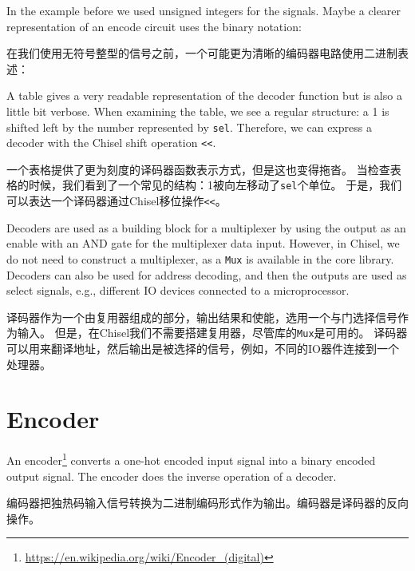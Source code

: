 \documentclass[%
    10pt,
    headinclude, footexclude,
    openright, %
    notitlepage,
    cleardoubleempty,
    headsepline,
    pointlessnumbers,
    bibtotoc, idxtotoc,
    ]{scrbook}
\newcommand{\code}[1]{{\small{\texttt{#1}}}}
\newcommand{\todo}[1]{{\emph{TODO: #1}}}
\newcommand{\myref}[2]{\href{#1}{#2}}
\renewcommand{\myref}[2]{{#2}{\footnote{\url{#1}}}}
\renewcommand{\todo}[1]{}
\begin{document}
In the example before we used unsigned integers for the signals. Maybe a clearer representation
of an encode circuit uses the binary notation:

在我们使用无符号整型的信号之前，一个可能更为清晰的编码器电路使用二进制表述：


\todo{from Luca: for very small examples. What if the one-hot input is 256 wires? Can Chisel capture that? Or I need 256 lines? I would suggest to put an additional example. Maybe there is something like the for loop in VHDL.}

A table gives a very readable representation of the decoder function but is also
a little bit verbose.
When examining the table, we see a regular structure: a 1 is shifted left by the number
represented by \code{sel}. Therefore, we can express a decoder with the Chisel shift
operation \code{<<}.

一个表格提供了更为刻度的译码器函数表示方式，但是这也变得拖沓。
当检查表格的时候，我们看到了一个常见的结构：1被向左移动了\code{sel}个单位。
于是，我们可以表达一个译码器通过Chisel移位操作\code{<<}。


Decoders are used as a building block for a multiplexer by using the output as an enable
with an AND gate for the multiplexer data input. However, in Chisel, we do not need to construct
a multiplexer, as a \code{Mux} is available in the core library.
Decoders can also be used for address decoding, and then the outputs are used as
select signals, e.g., different IO devices connected to a microprocessor. 

译码器作为一个由复用器组成的部分，输出结果和使能，选用一个与门选择信号作为输入。
但是，在Chisel我们不需要搭建复用器，尽管库的\code{Mux}是可用的。
译码器可以用来翻译地址，然后输出是被选择的信号，例如，不同的IO器件连接到一个处理器。


\section{Encoder}

An \myref{https://en.wikipedia.org/wiki/Encoder_(digital)}{encoder}
converts a one-hot encoded input signal into a binary encoded output signal.
The encoder does the inverse operation of a decoder.

编码器把独热码输入信号转换为二进制编码形式作为输出。编码器是译码器的反向操作。
\end{document}
